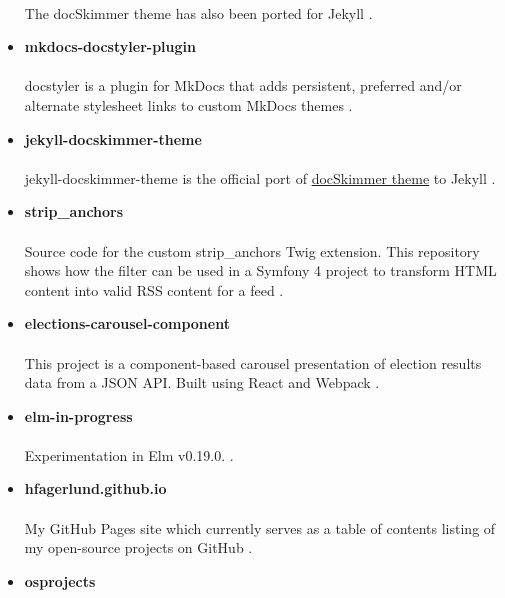 \documentclass[11pt]{article}
\begin{document}
\begin{itemize}
\paragraph{}
The docSkimmer theme has also been ported for Jekyll \cite{jekyll-docskimmer}.
\item \textbf{mkdocs-docstyler-plugin}
\paragraph{}
docstyler is a plugin for MkDocs that adds persistent, preferred
and/or alternate stylesheet links to custom MkDocs themes \cite{mkdocs-docstyler-plugin}.
\item \textbf{jekyll-docskimmer-theme}
 \paragraph{}
jekyll-docskimmer-theme is the official port of \href{https://github.com/hfagerlund/mkdocs-docskimmer}{docSkimmer theme} to Jekyll \cite{jekyll-docskimmer}.
\item \textbf{strip\_anchors}
\paragraph{}
Source code for the custom strip\_anchors Twig extension. This repository shows how the filter can be used in a Symfony 4 project to transform HTML content into valid RSS content for a feed \cite{stripanchors}.
\item \textbf{elections-carousel-component}
\paragraph{}
This project is a component-based carousel presentation of election results data from a JSON API. Built using React and Webpack \cite{elections-carousel-component}.
\item \textbf{elm-in-progress}
\paragraph{}
Experimentation in Elm v0.19.0.
 \cite{elm}.
\item \textbf{hfagerlund.github.io}
\paragraph{}
My GitHub Pages site which currently serves as a table of contents listing of my open-source projects on GitHub \cite{ghpages}.
\item \textbf{osprojects}

\end{itemize}
\end{document}
